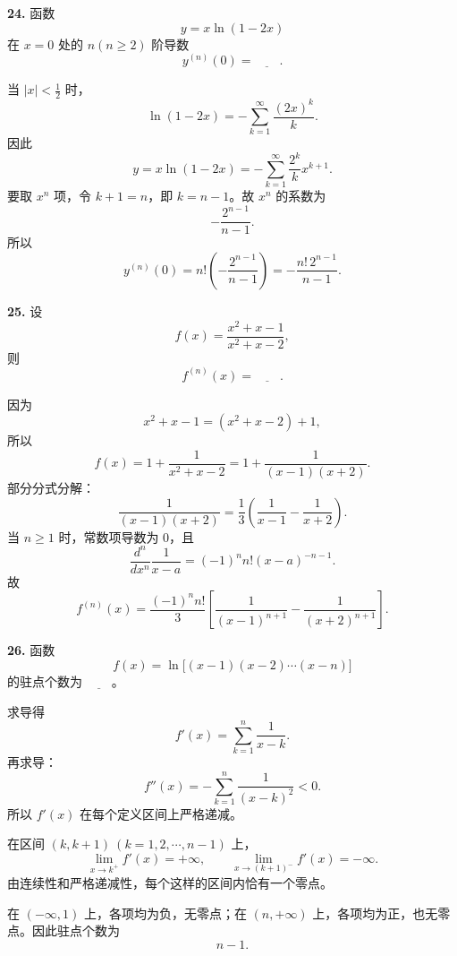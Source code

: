 \begin{problemblock}
\textbf{24.} 函数
\[
y=x\ln(1-2x)
\]
在 \(x=0\) 处的 \(n(n\ge2)\) 阶导数
\[
y^{(n)}(0)=\underline{\qquad}.
\]
\end{problemblock}

\begin{solutionblock}
当 \(|x|<\frac12\) 时，
\[
\ln(1-2x)=-\sum_{k=1}^{\infty}\frac{(2x)^k}{k}.
\]
因此
\[
y=x\ln(1-2x)
=-\sum_{k=1}^{\infty}\frac{2^k}{k}x^{k+1}.
\]
要取 \(x^n\) 项，令 \(k+1=n\)，即 \(k=n-1\)。故 \(x^n\) 的系数为
\[
-\frac{2^{n-1}}{n-1}.
\]
所以
\[
y^{(n)}(0)=n!\left(-\frac{2^{n-1}}{n-1}\right)
=-\frac{n!\,2^{n-1}}{n-1}.
\]
\end{solutionblock}

\begin{problemblock}
\textbf{25.} 设
\[
f(x)=\frac{x^2+x-1}{x^2+x-2},
\]
则
\[
f^{(n)}(x)=\underline{\qquad}.
\]
\end{problemblock}

\begin{solutionblock}
因为
\[
x^2+x-1=(x^2+x-2)+1,
\]
所以
\[
f(x)=1+\frac1{x^2+x-2}
=1+\frac1{(x-1)(x+2)}.
\]
部分分式分解：
\[
\frac1{(x-1)(x+2)}
=\frac13\left(\frac1{x-1}-\frac1{x+2}\right).
\]
当 \(n\ge1\) 时，常数项导数为 0，且
\[
\frac{d^n}{dx^n}\frac1{x-a}
=(-1)^n n!(x-a)^{-n-1}.
\]
故
\[
f^{(n)}(x)=\frac{(-1)^n n!}{3}
\left[
\frac1{(x-1)^{n+1}}-\frac1{(x+2)^{n+1}}
\right].
\]
\end{solutionblock}

\begin{problemblock}
\textbf{26.} 函数
\[
f(x)=\ln\bigl[(x-1)(x-2)\cdots(x-n)\bigr]
\]
的驻点个数为 \(\underline{\qquad}\)。
\end{problemblock}

\begin{solutionblock}
求导得
\[
f'(x)=\sum_{k=1}^n\frac1{x-k}.
\]
再求导：
\[
f''(x)=-\sum_{k=1}^n\frac1{(x-k)^2}<0.
\]
所以 \(f'(x)\) 在每个定义区间上严格递减。

在区间 \((k,k+1)\ (k=1,2,\cdots,n-1)\) 上，
\[
\lim_{x\to k^+}f'(x)=+\infty,\qquad
\lim_{x\to(k+1)^-}f'(x)=-\infty.
\]
由连续性和严格递减性，每个这样的区间内恰有一个零点。

在 \((-\infty,1)\) 上，各项均为负，无零点；在 \((n,+\infty)\) 上，各项均为正，也无零点。因此驻点个数为
\[
n-1.
\]
\end{solutionblock}

